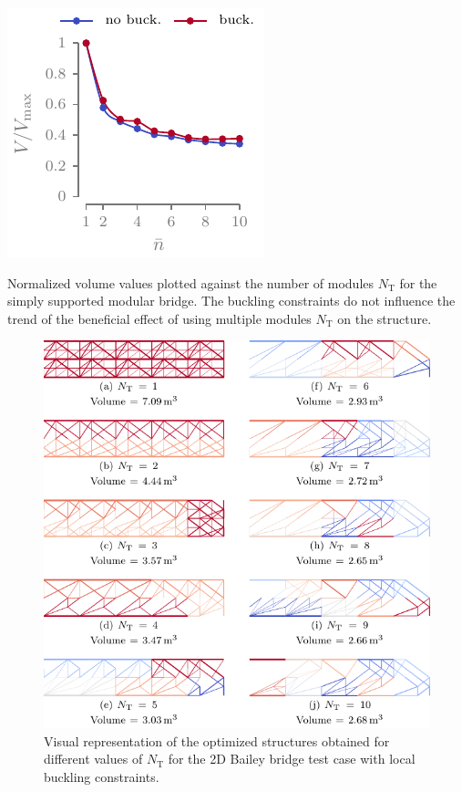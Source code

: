 \begin{marginfigure}
    \centering
    \includegraphics{figures/06_DMO/00_tug_bench_crv/vol.pdf}
    \caption{Normalized volume values plotted against the number of modules $N_\text{T}$ for the simply supported modular bridge. The buckling constraints do not influence the trend of the beneficial effect of using multiple modules $N_\text{T}$ on the structure.}
    \label{fig:06_cant_volume_norm}
\end{marginfigure}

\begin{figure}
    \centering
    \includegraphics{figures/06_DMO/00_tug_bench_buck/buck.pdf}
    \caption{Visual representation of the optimized structures obtained for different values of $N_\text{T}$ for the 2D Bailey bridge test case with local buckling constraints.}
    \label{fig:06_tug_bench_buck}
\end{figure}

